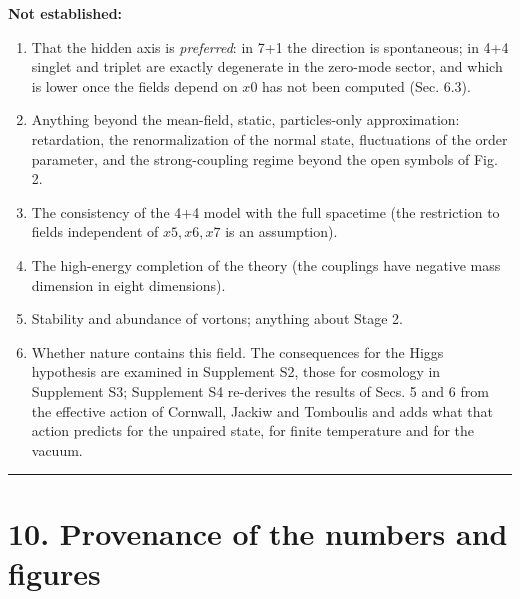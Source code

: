 \documentclass[
  10pt,
]{article}
\providecommand{\tightlist}{%
  \setlength{\itemsep}{0pt}\setlength{\parskip}{0pt}}
\begin{document}
\textbf{Not established:}

\begin{enumerate}
\def\labelenumi{\arabic{enumi}.}
\tightlist
\item
  That the hidden axis is \emph{preferred}: in 7+1 the direction is
  spontaneous; in 4+4 singlet and triplet are exactly degenerate in the
  zero-mode sector, and which is lower once the fields depend on \(x0\)
  has not been computed (Sec. 6.3).
\item
  Anything beyond the mean-field, static, particles-only approximation:
  retardation, the renormalization of the normal state, fluctuations of
  the order parameter, and the strong-coupling regime beyond the open
  symbols of Fig. 2.
\item
  The consistency of the 4+4 model with the full spacetime (the
  restriction to fields independent of \(x5,x6,x7\) is an assumption).
\item
  The high-energy completion of the theory (the couplings have negative
  mass dimension in eight dimensions).
\item
  Stability and abundance of vortons; anything about Stage 2.
\item
  Whether nature contains this field. The consequences for the Higgs
  hypothesis are examined in Supplement S2, those for cosmology in
  Supplement S3; Supplement S4 re-derives the results of Secs. 5 and 6
  from the effective action of Cornwall, Jackiw and Tomboulis and adds
  what that action predicts for the unpaired state, for finite
  temperature and for the vacuum.
\end{enumerate}

\begin{center}\rule{0.5\linewidth}{0.5pt}\end{center}

\hypertarget{provenance-of-the-numbers-and-figures}{%
\section{10. Provenance of the numbers and
figures}\label{provenance-of-the-numbers-and-figures}}
\end{document}
